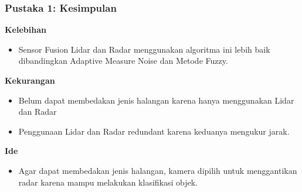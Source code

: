 \begin{frame}
    \frametitle{Pustaka 1: Kesimpulan}

    \large
    \textbf{Kelebihan}\\
    \normalsize
    \begin{itemize}
        \item Sensor Fusion Lidar dan Radar menggunakan algoritma ini lebih baik dibandingkan Adaptive Measure Noise dan Metode Fuzzy.
    \end{itemize}

    \large
    \textbf{Kekurangan}\\
    \normalsize
    \begin{itemize}
        \item Belum dapat membedakan jenis halangan karena hanya menggunakan Lidar dan Radar
        \item Penggunaan Lidar dan Radar redundant karena keduanya mengukur jarak.
    \end{itemize}

    \large
    \textbf{Ide}\\
    \normalsize
    \begin{itemize}
        \item Agar dapat membedakan jenis halangan, kamera dipilih untuk menggantikan radar karena mampu melakukan klasifikasi objek.
    \end{itemize}

\end{frame}
